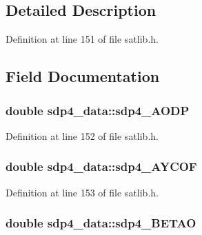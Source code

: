 \subsection{Detailed Description}


Definition at line 151 of file satlib.\-h.



\subsection{Field Documentation}
\hypertarget{structsdp4__data_afbedc47b304f6362de6f565f215b110e}{
\subsubsection[{sdp4\-\_\-\-A\-O\-D\-P}]{\setlength{\rightskip}{0pt plus 5cm}double sdp4\-\_\-data\-::sdp4\-\_\-\-A\-O\-D\-P}}\label{structsdp4__data_afbedc47b304f6362de6f565f215b110e}


Definition at line 152 of file satlib.\-h.

\hypertarget{structsdp4__data_ae1233bb05e56bb56bdd4eb199fbe8585}{
\subsubsection[{sdp4\-\_\-\-A\-Y\-C\-O\-F}]{\setlength{\rightskip}{0pt plus 5cm}double sdp4\-\_\-data\-::sdp4\-\_\-\-A\-Y\-C\-O\-F}}\label{structsdp4__data_ae1233bb05e56bb56bdd4eb199fbe8585}


Definition at line 153 of file satlib.\-h.

\hypertarget{structsdp4__data_a7fcb25a5006f55ea58d8d945a4d7d2aa}{
\subsubsection[{sdp4\-\_\-\-B\-E\-T\-A\-O}]{\setlength{\rightskip}{0pt plus 5cm}double sdp4\-\_\-data\-::sdp4\-\_\-\-B\-E\-T\-A\-O}}\label{structsdp4__data_a7fcb25a5006f55ea58d8d945a4d7d2aa}


